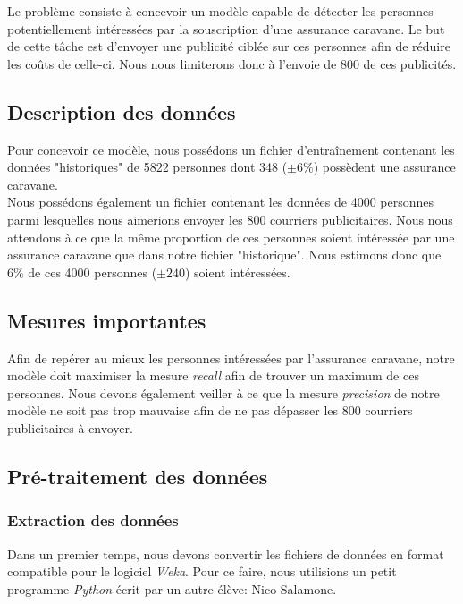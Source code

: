 \documentclass[10pt,a4paper]{article}
\begin{document}
		   	Le problème consiste à concevoir un modèle capable de détecter les personnes potentiellement intéressées par la souscription d'une assurance caravane. Le but de cette tâche est d'envoyer une publicité ciblée sur ces personnes afin de réduire les coûts de celle-ci. Nous nous limiterons donc à l'envoie de 800 de ces publicités.\\
		   	
		\subsection{Description des données}
		   	
		   	Pour concevoir ce modèle, nous possédons un fichier d'entraînement contenant les données "historiques" de 5822 personnes dont 348 ($\pm6\%$) possèdent une assurance caravane.\\
		   	
		   	Nous possédons également un fichier contenant les données de 4000 personnes parmi lesquelles nous aimerions envoyer les 800 courriers publicitaires. Nous nous attendons à ce que la même proportion de ces personnes soient intéressée par une assurance caravane que dans notre fichier "historique". Nous estimons donc que $6\%$ de ces 4000 personnes ($\pm240$) soient intéressées.
		   	
		\subsection{Mesures importantes}
		
			Afin de repérer au mieux les personnes intéressées par l'assurance caravane, notre modèle doit maximiser la mesure \textit{recall} afin de trouver un maximum de ces personnes. Nous devons également veiller à ce que la mesure \textit{precision} de notre modèle ne soit pas trop mauvaise afin de ne pas dépasser les 800 courriers publicitaires à envoyer.
			
		\subsection{Pré-traitement des données}
		
			\subsubsection*{Extraction des données}
			
				Dans un premier temps, nous devons convertir les fichiers de données en format compatible pour le logiciel \textit{Weka}. Pour ce faire, nous utilisions un petit programme \textit{Python} écrit par un autre élève: Nico Salamone.
				
\end{document}
